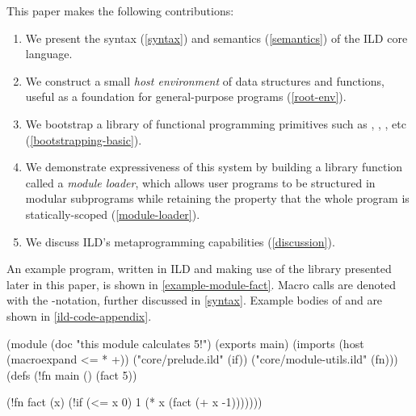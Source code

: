 This paper makes the following contributions:
\begin{enumerate}
  \item We present the syntax (\cref{syntax}) and semantics (\cref{semantics}) of the ILD core language.
  \item We construct a small \emph{host environment} of data structures and functions,
  useful as a foundation for general-purpose programs (\cref{root-env}).
  \item We bootstrap a library of functional programming primitives such as ,
  , , etc (\cref{bootstrapping-basic}).
  \item We demonstrate expressiveness of
    this system by building a library function called a \emph{module
    loader}, which allows user programs to be structured in modular subprograms
    while retaining the property that the whole program is statically-scoped
    (\cref{module-loader}).
  \item We discuss ILD's metaprogramming capabilities (\cref{discussion}).
\end{enumerate}
An example program, written in ILD and making use of the library presented
later in this paper, is shown in
\cref{example-module-fact}.
Macro calls are denoted with the \ild{!}-notation,
further discussed in \cref{syntax}.
Example bodies of  and  are
shown in \cref{ild-code-appendix}.
\begin{ildcode}
(module
  (doc "this module calculates 5!")
  (exports main)
  (imports
    (host (macroexpand <= * +))
    ("core/prelude.ild" (if))
    ("core/module-utils.ild" (fn)))
  (defs
    (!fn main () (fact 5))

    (!fn fact (x)
      (!if (<= x 0)
        1
        (* x (fact (+ x -1)))))))
\end{ildcode}
\label{example-module-fact}
